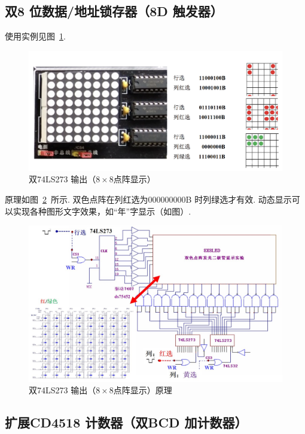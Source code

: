 \documentclass[11pt]{SEU-Digital-Report}
\begin{document}
        \newpage
    \subsection{双8 位数据/地址锁存器（8D 触发器）}

        使用实例见图~\ref{fig:8x8_}.

    \begin{figure}[htbp]
      \centering
      \includegraphics[width=.8\linewidth]{fig/8x8_.png}
      \caption{双74LS273 输出（$8\times 8$点阵显示）}
      \label{fig:8x8_}
    \end{figure}

    原理如图~\ref{fig:8x8__}~所示. 双色点阵在列红选为000000000B 时列绿选才有效. 动态显示可
    以实现各种图形文字效果，如“年”字显示（如图）.
    \begin{figure}[htbp]
      \centering
      \includegraphics[width=.9\linewidth]{fig/8x8__.jpg}
      \caption{双74LS273 输出（$8\times 8$点阵显示）原理}
      \label{fig:8x8__}
    \end{figure}

    \newpage
    \subsection{扩展CD4518 计数器（双BCD 加计数器）}
\end{document}
